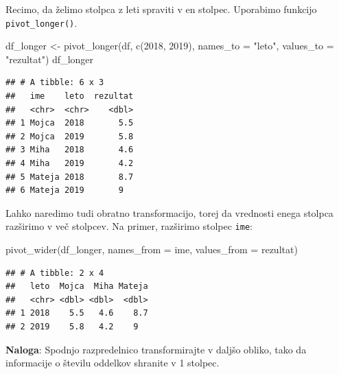 \documentclass[
]{book}
\newenvironment{Shaded}{\begin{snugshade}}{\end{snugshade}}
\newcommand{\AttributeTok}[1]{\textcolor[rgb]{0.77,0.63,0.00}{#1}}
\newcommand{\FunctionTok}[1]{\textcolor[rgb]{0.00,0.00,0.00}{#1}}
\newcommand{\NormalTok}[1]{#1}
\newcommand{\OtherTok}[1]{\textcolor[rgb]{0.56,0.35,0.01}{#1}}
\newcommand{\StringTok}[1]{\textcolor[rgb]{0.31,0.60,0.02}{#1}}
\begin{document}
Recimo, da želimo stolpca z leti spraviti v en stolpec. Uporabimo funkcijo \texttt{pivot\_longer()}.

\begin{Shaded}
\begin{Highlighting}[]
\NormalTok{df\_longer }\OtherTok{\textless{}{-}} \FunctionTok{pivot\_longer}\NormalTok{(df, }\FunctionTok{c}\NormalTok{(}\StringTok{\textasciigrave{}}\AttributeTok{2018}\StringTok{\textasciigrave{}}\NormalTok{, }\StringTok{\textasciigrave{}}\AttributeTok{2019}\StringTok{\textasciigrave{}}\NormalTok{), }\AttributeTok{names\_to =} \StringTok{"leto"}\NormalTok{, }\AttributeTok{values\_to =} \StringTok{"rezultat"}\NormalTok{)}
\NormalTok{df\_longer}
\end{Highlighting}
\end{Shaded}

\begin{verbatim}
## # A tibble: 6 x 3
##   ime    leto  rezultat
##   <chr>  <chr>    <dbl>
## 1 Mojca  2018       5.5
## 2 Mojca  2019       5.8
## 3 Miha   2018       4.6
## 4 Miha   2019       4.2
## 5 Mateja 2018       8.7
## 6 Mateja 2019       9
\end{verbatim}

Lahko naredimo tudi obratno transformacijo, torej da vrednosti enega stolpca razširimo v več stolpcev. Na primer, razširimo stolpec \texttt{ime}:

\begin{Shaded}
\begin{Highlighting}[]
\FunctionTok{pivot\_wider}\NormalTok{(df\_longer, }\AttributeTok{names\_from =}\NormalTok{ ime, }\AttributeTok{values\_from =}\NormalTok{ rezultat)}
\end{Highlighting}
\end{Shaded}

\begin{verbatim}
## # A tibble: 2 x 4
##   leto  Mojca  Miha Mateja
##   <chr> <dbl> <dbl>  <dbl>
## 1 2018    5.5   4.6    8.7
## 2 2019    5.8   4.2    9
\end{verbatim}

\textbf{Naloga}: Spodnjo razpredelnico transformirajte v daljšo obliko, tako da informacije o številu oddelkov shranite v 1 stolpec.
\end{document}
